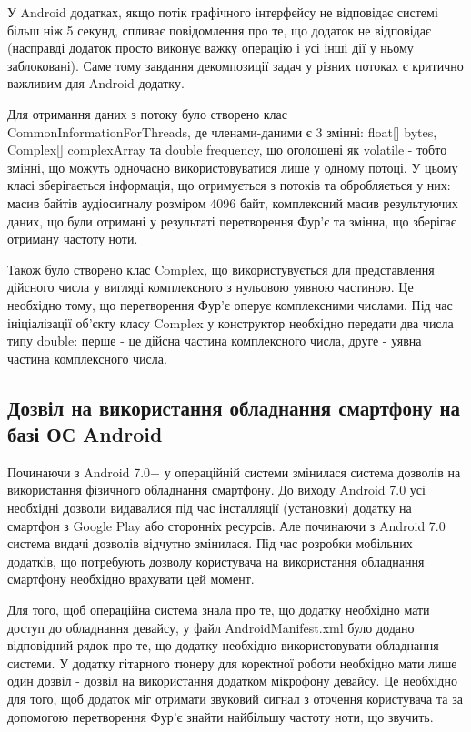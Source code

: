 У Android додатках, якщо потік графічного інтерфейсу не відповідає системі більш ніж 5 секунд, спливає повідомлення про те, що додаток не відповідає (насправді додаток просто виконує важку операцію і усі інші дії у ньому заблоковані). Саме тому завдання декомпозиції задач у різних потоках є критично важливим для Android додатку. 

Для отримання даних з потоку було створено клас CommonInformationForThreads, де членами-даними є 3 змінні: float[] bytes, Complex[] complexArray та double frequency, що оголошені як volatile - тобто змінні, що можуть одночасно використовуватися лише у одному потоці. У цьому класі зберігається інформація, що отримується з потоків та обробляється у них: масив байтів аудіосигналу розміром 4096 байт, комплексний масив результуючих даних, що були отримані у результаті перетворення Фур'є та змінна, що зберігає отриману частоту ноти. 

Також було створено клас Complex, що використувується для представлення дійсного числа у вигляді комплексного з нульовою уявною частиною. Це необхідно тому, що перетворення Фур'є оперує комплексними числами. Під час ініціалізації об'єкту класу Complex у конструктор необхідно передати два числа типу double: перше - це дійсна частина комплексного числа, друге - уявна частина комплексного числа.

\subsection{Дозвіл на використання обладнання смартфону на базі ОС Android}

Починаючи з Android 7.0+ у операційній системи змінилася система дозволів на використання фізичного обладнання смартфону. До виходу Android 7.0 усі необхідні дозволи видавалися під час інсталляції (установки) додатку на смартфон з Google Play або сторонніх ресурсів. Але починаючи з Android 7.0 система видачі дозволів відчутно змінилася. Під час розробки мобільних додатків, що потребують дозволу користувача на використання обладнання смартфону необхідно врахувати цей момент.

Для того, щоб операційна система знала про те, що додатку необхідно мати доступ до обладнання девайсу, у файл AndroidManifest.xml було додано відповідний рядок про те, що додатку необхідно використовувати обладнання системи. У додатку гітарного тюнеру для коректної роботи необхідно мати лише один дозвіл - дозвіл на використання додатком мікрофону девайсу. Це необхідно для того, щоб додаток міг отримати звуковий сигнал з оточення користувача та за допомогою перетворення Фур'є знайти найбільшу частоту ноти, що звучить.


